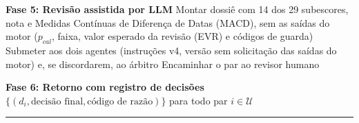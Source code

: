\begin{algorithmic}[1]
\medskip
\STATE \textbf{Fase 5: Revisão assistida por LLM}
    \STATE Montar dossiê com 14 dos 29 subescores, nota e Medidas Contínuas de Diferença de Datas (MACD), sem as saídas do motor ($p_{\mathit{cal}}$, faixa, valor esperado da revisão (EVR) e códigos de guarda)
    \STATE Submeter aos dois agentes (instruções v4, versão sem solicitação das saídas do motor) e, se discordarem, ao árbitro
        \STATE Encaminhar o par ao revisor humano
    \ENDIF
\ENDFOR

\medskip
\STATE \textbf{Fase 6: Retorno com registro de decisões}
\RETURN $\{(d_i, \text{decisão final}, \text{código de razão})\}$ para todo par $i \in \mathcal{U}$

\end{algorithmic}
\noindent\rule{\textwidth}{0.4pt}
